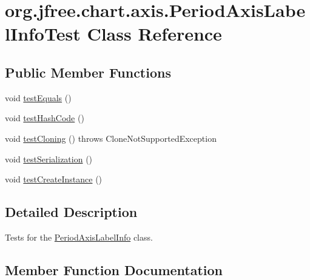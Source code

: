 \hypertarget{classorg_1_1jfree_1_1chart_1_1axis_1_1_period_axis_label_info_test}{}\section{org.\+jfree.\+chart.\+axis.\+Period\+Axis\+Label\+Info\+Test Class Reference}
\label{classorg_1_1jfree_1_1chart_1_1axis_1_1_period_axis_label_info_test}
\subsection*{Public Member Functions}
\begin{DoxyCompactItemize}
\item 
void \mbox{\hyperlink{classorg_1_1jfree_1_1chart_1_1axis_1_1_period_axis_label_info_test_aadae33d03d0c8fb2c0b041b834b1aa60}{test\+Equals}} ()
\item 
void \mbox{\hyperlink{classorg_1_1jfree_1_1chart_1_1axis_1_1_period_axis_label_info_test_ac973e8424289d7d4eea77a09f0b922b4}{test\+Hash\+Code}} ()
\item 
void \mbox{\hyperlink{classorg_1_1jfree_1_1chart_1_1axis_1_1_period_axis_label_info_test_a81f9c06473c3797ac9dd9d86e623e71b}{test\+Cloning}} ()  throws Clone\+Not\+Supported\+Exception 
\item 
void \mbox{\hyperlink{classorg_1_1jfree_1_1chart_1_1axis_1_1_period_axis_label_info_test_ad37069fcb81888fba9668a23489230d1}{test\+Serialization}} ()
\item 
void \mbox{\hyperlink{classorg_1_1jfree_1_1chart_1_1axis_1_1_period_axis_label_info_test_a7bd50bd03cb04a1668726f5df7057f08}{test\+Create\+Instance}} ()
\end{DoxyCompactItemize}


\subsection{Detailed Description}
Tests for the \mbox{\hyperlink{classorg_1_1jfree_1_1chart_1_1axis_1_1_period_axis_label_info}{Period\+Axis\+Label\+Info}} class. 

\subsection{Member Function Documentation}
\mbox{\label{classorg_1_1jfree_1_1chart_1_1axis_1_1_period_axis_label_info_test_a81f9c06473c3797ac9dd9d86e623e71b}} 
